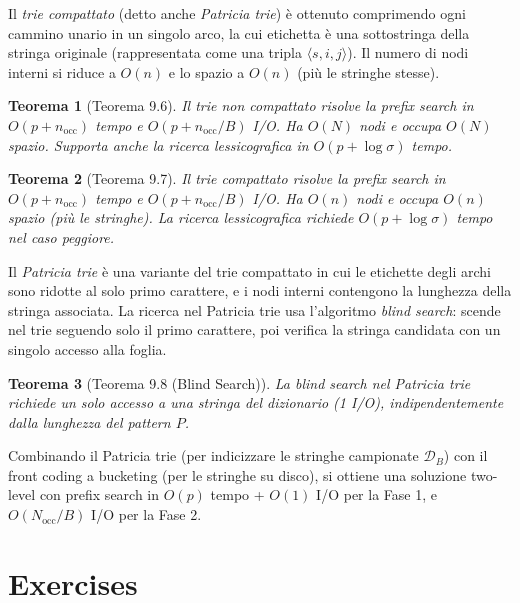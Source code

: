 \documentclass[12pt, a4paper, oneside]{book}
\theoremstyle{plain}
\newtheorem{teorema}{Teorema}[chapter]
\theoremstyle{definition}
\theoremstyle{remark}
\begin{document}
Il \emph{trie compattato} (detto anche \emph{Patricia trie}) è ottenuto comprimendo ogni cammino unario in un singolo arco, la cui etichetta è una sottostringa della stringa originale (rappresentata come una tripla $\langle s, i, j\rangle$). Il numero di nodi interni si riduce a $O(n)$ e lo spazio a $O(n)$ (più le stringhe stesse).

\begin{teorema}[Teorema 9.6]
Il trie non compattato risolve la prefix search in $O(p + n_{\mathrm{occ}})$ tempo e $O(p + n_{\mathrm{occ}}/B)$ I/O. Ha $O(N)$ nodi e occupa $O(N)$ spazio. Supporta anche la ricerca lessicografica in $O(p + \log\sigma)$ tempo.
\end{teorema}

\begin{teorema}[Teorema 9.7]
Il trie compattato risolve la prefix search in $O(p + n_{\mathrm{occ}})$ tempo e $O(p + n_{\mathrm{occ}}/B)$ I/O. Ha $O(n)$ nodi e occupa $O(n)$ spazio (più le stringhe). La ricerca lessicografica richiede $O(p + \log\sigma)$ tempo nel caso peggiore.
\end{teorema}

Il \emph{Patricia trie} è una variante del trie compattato in cui le etichette degli archi sono ridotte al solo primo carattere, e i nodi interni contengono la lunghezza della stringa associata. La ricerca nel Patricia trie usa l'algoritmo \emph{blind search}: scende nel trie seguendo solo il primo carattere, poi verifica la stringa candidata con un singolo accesso alla foglia.

\begin{teorema}[Teorema 9.8 (Blind Search)]
La blind search nel Patricia trie richiede un solo accesso a una stringa del dizionario (1 I/O), indipendentemente dalla lunghezza del pattern $P$.
\end{teorema}

Combinando il Patricia trie (per indicizzare le stringhe campionate $\mathcal{D}_B$) con il front coding a bucketing (per le stringhe su disco), si ottiene una soluzione two-level con prefix search in $O(p)$ tempo + $O(1)$ I/O per la Fase 1, e $O(N_{\mathrm{occ}}/B)$ I/O per la Fase 2.

\section{Exercises}
\end{document}
